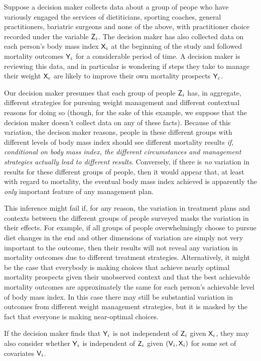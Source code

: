 \begin{example}\label{ex:doctor_precedent}
Suppose a decision maker collects data about a group of peope who have variously engaged the services of dietiticians, sporting coaches, general practitioners, bariatric surgeons and none of the above, with practitioner choice recorded under the variable $\mathsf{Z}_i$. The decision maker has also collected data on each person's body mass index $\mathsf{X}_i$ at the beginning of the study and followed mortality outcomes $\mathsf{Y}_i$ for a considerable period of time. A decision maker is reviewing this data, and in particular is wondering if steps they take to manage their weight $\mathsf{X}_c$ are likely to improve their own mortality prospects $\mathsf{Y}_c$.

Our decision maker presumes that each group of people $\mathsf{Z}_i$ has, in aggregate, different strategies for pursuing weight management and different contextual reasons for doing so (though, for the sake of this example, we suppose that the decision maker doesn't collect data on any of these facts). Because of this variation, the decison maker reasons, people in these different groups with different levels of body mass index should see different mortality results \emph{if, conditional on body mass index, the different circumstances and management strategies actually lead to different results}. Conversely, if there is \emph{no} variation in results for these different groups of people, then it would appear that, at least with regard to mortality, the eventual body mass index achieved is apparently the \emph{only} important feature of any management plan.

This inference might fail if, for any reason, the variation in treatment plans and contexts between the different groups of people surveyed masks the variation in their effects. For example, if all groups of people overwhelmingly choose to pursue diet changes in the end and other dimensions of variation are simply not very important to the outcome, then their results will not reveal any variation in mortality outcomes due to different treatment strategies. Alternatively, it might be the case that everybody is making choices that achieve nearly optimal mortality prospects given their unobserved context and that the best achievable mortality outcomes are approximately the same for each person's achievable level of body mass index. In this case there may still be substantial variation in outcomes from different weight management strategies, but it is masked by the fact that everyone is making near-optimal choices.

If the decision maker finds that $\mathsf{Y}_i$ is not independent of $\mathsf{Z}_i$ given $\mathsf{X}_i$, they may also consider whether $\mathsf{Y}_i$ is independent of $\mathsf{Z}_i$ given $(\mathsf{V}_i,\mathsf{X}_i)$ for some set of covariates $\mathsf{V}_i$.
\end{example}


